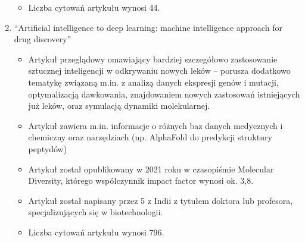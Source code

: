\begin{enumerate}
\begin{itemize}
        \item Liczba cytowań artykułu wynosi 44.
    \end{itemize}
    \item “Artificial intelligence to deep learning: machine intelligence approach for drug discovery”
    \begin{itemize}
        \item Artykuł przeglądowy omawiający bardziej szczegółowo zastosowanie sztucznej inteligencji w odkrywaniu nowych leków – porusza dodatkowo tematykę związaną m.in. z analizą danych ekspresji genów i mutacji, optymalizacją dawkowania, znajdowaniem nowych zastosowań istniejących już leków, oraz symulacją dynamiki molekularnej. 
        \item Artykuł zawiera m.in. informacje o różnych baz danych medycznych i chemiczny oraz narzędziach (np. AlphaFold do predykcji struktury peptydów)
        \item Artykuł został opublikowany w 2021 roku w czasopiśmie Molecular Diversity, którego współczynnik impact factor wynosi ok. 3,8.
        \item Artykuł został napisany przez 5 z Indii z tytułem doktora lub profesora, specjalizujących się w biotechnologii.
        \item Liczba cytowań artykułu wynosi 796.
    \end{itemize}
\end{enumerate}
